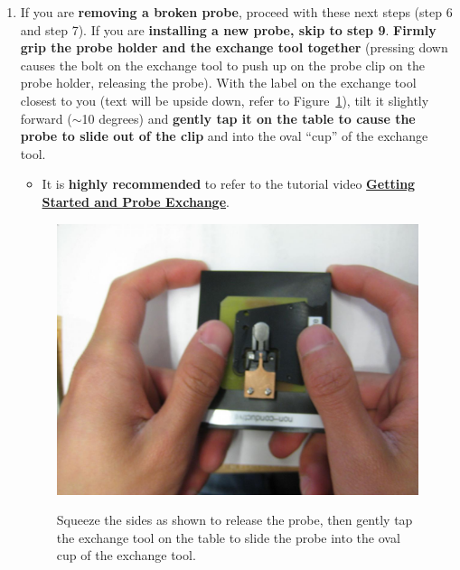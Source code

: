 \documentclass{../lab}
\begin{document}
\begin{enumerate}
    \item If you are \textbf{removing a broken probe}, proceed with these next steps (step 6 and step 7). If you are\textbf{ installing a new probe, skip to step 9}. \textbf{Firmly grip the probe holder and the exchange tool together} (pressing down causes the bolt on the exchange tool to push up on the probe clip on the probe holder, releasing the probe).  With the label on the exchange tool closest to you (text will be upside down, refer to Figure~\ref{fig:HoldingTool}), tilt it slightly forward ($\sim$10 degrees) and \textbf{gently tap it on the table to cause the probe to slide out of the clip} and into the oval ``cup'' of the exchange tool.
    \begin{itemize}
        \item It is \textbf{highly recommended} to refer to the tutorial video \href{http://experimentationlab.berkeley.edu/sites/default/files/gettingstarted\_final2.mp4}{\textbf{Getting Started and Probe Exchange}}.
    \end{itemize}

    \begin{figure}[H]
    \centering
    \begin{minipage}{0.6\linewidth}
        \href{http://experimentationlab.berkeley.edu/sites/default/files/AFMImages/18.JPG}{\includegraphics[width=\linewidth]{images/18.JPG}}
        \caption{Squeeze the sides as shown to release the probe, then gently tap the exchange tool on the table to slide the probe into the oval cup of the exchange tool.}
        \label{fig:HoldingTool}
        \end{minipage}
    \end{figure}
    

\end{enumerate}
\end{document}
